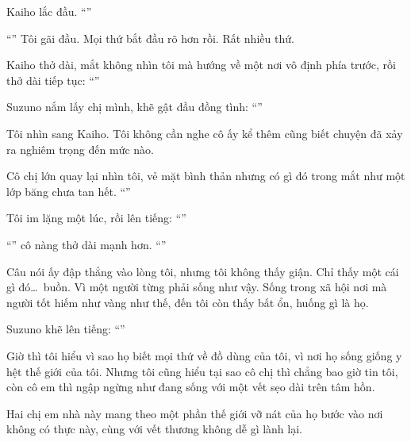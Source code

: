 \documentclass[../main.tex]{subfiles}
\begin{document}
Kaiho lắc đầu. ``''

``'' Tôi gãi đầu. Mọi thứ bắt đầu rõ hơn rồi. Rất nhiều thứ.

Kaiho thở dài, mắt không nhìn tôi mà hướng về một nơi vô định phía trước, rồi thở dài tiếp tục: ``''

Suzuno nắm lấy chị mình, khẽ gật đầu đồng tình: ``''

Tôi nhìn sang Kaiho. Tôi không cần nghe cô ấy kể thêm cũng biết chuyện đã xảy ra nghiêm trọng đến mức nào.

Cô chị lớn quay lại nhìn tôi, vẻ mặt bình thản nhưng có gì đó trong mắt như một lớp băng chưa tan hết. ``''

Tôi im lặng một lúc, rồi lên tiếng: ``''

``'' cô nàng thở dài mạnh hơn. ``''

Câu nói ấy đập thẳng vào lòng tôi, nhưng tôi không thấy giận. Chỉ thấy một cái gì đó\dots\ buồn. Vì một người từng phải sống như vậy. Sống trong xã hội nơi mà người tốt hiếm như vàng như thế, đến tôi còn thấy bất ổn, huống gì là họ.

Suzuno khẽ lên tiếng: ``''

Giờ thì tôi hiểu vì sao họ biết mọi thứ về đồ dùng của tôi, vì nơi họ sống giống y hệt thế giới của tôi. Nhưng tôi cũng hiểu tại sao cô chị thì chẳng bao giờ tin tôi, còn cô em thì ngập ngừng như đang sống với một vết sẹo dài trên tâm hồn.

Hai chị em nhà này mang theo một phần thế giới vỡ nát của họ bước vào nơi không có thực này, cùng với vết thương không dễ gì lành lại.
\end{document}
